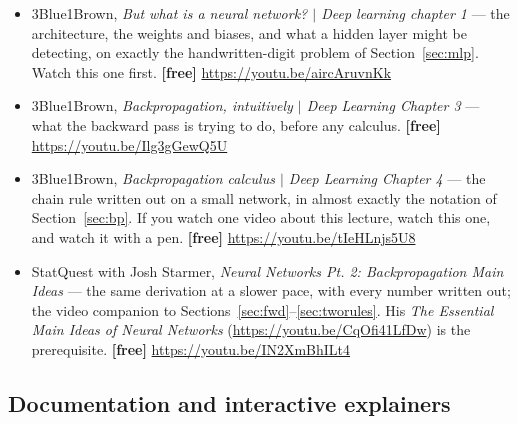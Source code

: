 \documentclass[11pt]{article}
\begin{document}
\begin{itemize}[leftmargin=*]
  \item 3Blue1Brown, \emph{But what is a neural network? $\vert$ Deep learning
    chapter 1} --- the architecture, the weights and biases, and what a hidden
    layer might be detecting, on exactly the handwritten-digit problem of
    Section~\ref{sec:mlp}. Watch this one first. \textbf{[free]}
    \url{https://youtu.be/aircAruvnKk}
  \item 3Blue1Brown, \emph{Backpropagation, intuitively $\vert$ Deep Learning
    Chapter 3} --- what the backward pass is trying to do, before any calculus.
    \textbf{[free]} \url{https://youtu.be/Ilg3gGewQ5U}
  \item 3Blue1Brown, \emph{Backpropagation calculus $\vert$ Deep Learning
    Chapter 4} --- the chain rule written out on a small network, in almost
    exactly the notation of Section~\ref{sec:bp}. If you watch one video
    about this lecture, watch this one, and watch it with a pen.
    \textbf{[free]} \url{https://youtu.be/tIeHLnjs5U8}
  \item StatQuest with Josh Starmer, \emph{Neural Networks Pt. 2:
    Backpropagation Main Ideas} --- the same derivation at a slower pace, with
    every number written out; the video companion to
    Sections~\ref{sec:fwd}--\ref{sec:tworules}. His \emph{The Essential Main
    Ideas of Neural Networks} (\url{https://youtu.be/CqOfi41LfDw}) is the
    prerequisite. \textbf{[free]} \url{https://youtu.be/IN2XmBhILt4}
\end{itemize}

\subsection*{Documentation and interactive explainers}
\end{document}
